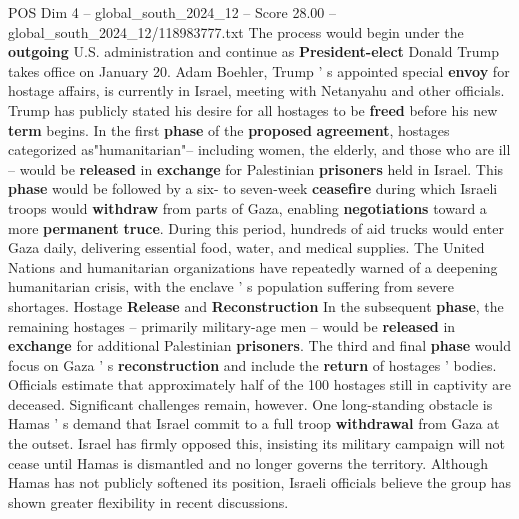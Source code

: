 \begin{textsample}{POS Dim 4 – global\_south\_2024\_12 – Score 28.00 – global\_south\_2024\_12/118983777.txt}
The process would begin under the \textbf{outgoing} U.S. administration and continue as \textbf{President-elect} Donald Trump takes office on January 20.
Adam Boehler, Trump ' s appointed special \textbf{envoy} for hostage affairs, is currently in Israel, meeting with Netanyahu and other officials.
Trump has publicly stated his desire for all hostages to be \textbf{freed} before his new \textbf{term} begins.
In the first \textbf{phase} of the \textbf{proposed} \textbf{agreement}, hostages categorized as"humanitarian"-- including women, the elderly, and those who are ill -- would be \textbf{released} in \textbf{exchange} for Palestinian \textbf{prisoners} held in Israel.
This \textbf{phase} would be followed by a six- to seven-week \textbf{ceasefire} during which Israeli troops would \textbf{withdraw} from parts of Gaza, enabling \textbf{negotiations} toward a more \textbf{permanent} \textbf{truce}.
During this period, hundreds of aid trucks would enter Gaza daily, delivering essential food, water, and medical supplies.
The United Nations and humanitarian organizations have repeatedly warned of a deepening humanitarian crisis, with the enclave ' s population suffering from severe shortages.
Hostage \textbf{Release} and \textbf{Reconstruction} In the subsequent \textbf{phase}, the remaining hostages -- primarily military-age men -- would be \textbf{released} in \textbf{exchange} for additional Palestinian \textbf{prisoners}.
The third and final \textbf{phase} would focus on Gaza ' s \textbf{reconstruction} and include the \textbf{return} of hostages ' bodies.
Officials estimate that approximately half of the 100 hostages still in captivity are deceased.
Significant challenges remain, however.
One long-standing obstacle is Hamas ' s demand that Israel commit to a full troop \textbf{withdrawal} from Gaza at the outset.
Israel has firmly opposed this, insisting its military campaign will not cease until Hamas is dismantled and no longer governs the territory.
Although Hamas has not publicly softened its position, Israeli officials believe the group has shown greater flexibility in recent discussions.

\end{textsample}
